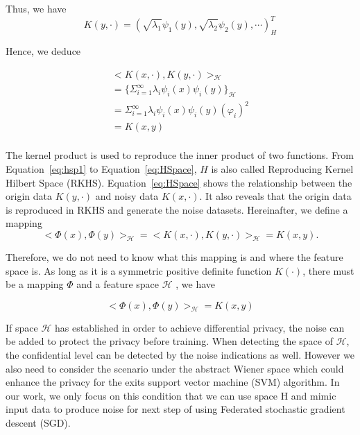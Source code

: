 \documentclass[journal,transmag]{IEEEtran}
\begin{document}
Thus, we have
\begin{equation}
    K(y,\cdot)=(\sqrt{\lambda_1} \psi_1 (y), \sqrt{\lambda_2 } \psi_2 (y),\cdots)_H^T
\end{equation}

Hence, we deduce

\begin{equation}
\begin{array}{ll}
    <K(x,\cdot),K(y,\cdot)>_{\mathcal{H}} \\
    =\{\Sigma_{i=1}^\infty \lambda_i \psi_i (x)\psi_i (y)\}_{\mathcal{H}} \\
    =\Sigma_{i=1}^\infty \lambda_i \psi_i (x)\psi_i (y) (\varphi_i)^2 \\
    = K(x,y) \\
\end{array}
\label{eq:HSpace}
\end{equation}

The kernel product is used to reproduce the inner product of two functions. From Equation~\ref{eq:hsp1} to Equation~\ref{eq:HSpace}, $H$ is also called Reproducing Kernel Hilbert Space (RKHS). Equation~\eqref{eq:HSpace} shows the relationship between the origin data $K(y,\cdot)$ and noisy data $K(x,\cdot)$. It also reveals that the origin data is reproduced in RKHS and generate the noise datasets. %
Hereinafter, we define a mapping 
\begin{equation}
        <\Phi(x),\Phi(y)>_{\mathcal{H}}=<K(x,\cdot),K(y,\cdot)>_{\mathcal{H}} = K(x,y).
\end{equation}

Therefore, we do not need to know what this mapping is and where the feature space is. As long as it is a symmetric positive definite function $K(\cdot)$, there must be a mapping $\Phi$ and a feature space $\mathcal{H}$ , we have

\begin{equation}
<\Phi(x),\Phi(y)>_{\mathcal{H}} = K(x,y)
\end{equation}

If space $\mathcal{H}$ has established in order to achieve differential privacy, the noise can be added to protect the privacy before training. When detecting the space of $\mathcal{H}$, the confidential level can be detected by the noise indications as well. However we also need to consider the scenario under the abstract Wiener space which could enhance the privacy for the exits support vector machine (SVM) algorithm. In our work, we only focus on this condition that we can use space H and mimic input data to produce noise for next step of using Federated stochastic gradient descent (SGD). 
\end{document}
